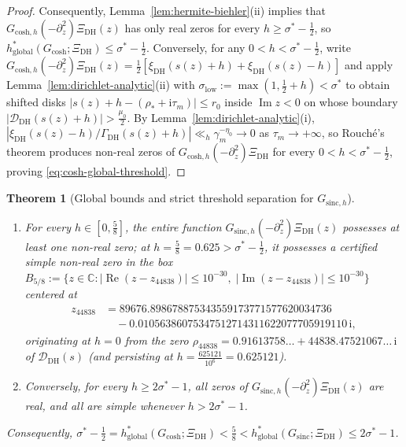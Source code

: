\documentclass[11pt,a4paper,reqno]{amsart}
\newtheorem{theorem}{Theorem}[section]
\theoremstyle{definition}
\theoremstyle{remark}
\numberwithin{equation}{section}
\newcommand{\C}{\mathbb{C}}
\newcommand{\ii}{\mathrm{i}}
\DeclareMathOperator{\Reop}{Re}
\DeclareMathOperator{\Imop}{Im}
\begin{document}
\begin{proof}
Consequently, Lemma~\ref{lem:hermite-biehler}(ii) implies that $G_{\mathrm{cosh},h}(-\partial_z^2)\Xi_{\mathrm{DH}}(z)$ has only real zeros for every $h \ge \sigma^* - \frac{1}{2}$, so $h_{\mathrm{global}}^*(G_{\mathrm{cosh}}; \Xi_{\mathrm{DH}}) \le \sigma^* - \frac{1}{2}$. Conversely, for any $0 < h < \sigma^* - \frac{1}{2}$, write $G_{\mathrm{cosh},h}(-\partial_z^2)\Xi_{\mathrm{DH}}(z) = \frac{1}{2}[\xi_{\mathrm{DH}}(s(z) + h) + \xi_{\mathrm{DH}}(s(z) - h)]$ and apply Lemma~\ref{lem:dirichlet-analytic}(ii) with $\sigma_{\mathrm{low}} := \max(1, \frac{1}{2} + h) < \sigma^*$ to obtain shifted disks $|s(z) + h - (\rho_* + \ii\tau_m)| \le r_0$ inside $\Imop z < 0$ on whose boundary $|\mathcal{D}_{\mathrm{DH}}(s(z)+h)| > \frac{\mu_0}{2}$. By Lemma~\ref{lem:dirichlet-analytic}(i), $|\xi_{\mathrm{DH}}(s(z) - h)/\Gamma_{\mathrm{DH}}(s(z) + h)| \ll_h \gamma_m^{-\eta_0} \to 0$ as $\tau_m \to +\infty$, so Rouch\'e's theorem produces non-real zeros of $G_{\mathrm{cosh},h}(-\partial_z^2)\Xi_{\mathrm{DH}}$ for every $0 < h < \sigma^* - \frac{1}{2}$, proving \eqref{eq:cosh-global-threshold}.
\end{proof}

\begin{theorem}[Global bounds and strict threshold separation for $G_{\mathrm{sinc},h}$]
\label{thm:sinc-separation}
\leavevmode
\begin{enumerate}[label=\textup{(\roman*)},leftmargin=2.0em]
  \item For every $h \in [0, \frac{5}{8}]$, the entire function $G_{\mathrm{sinc},h}(-\partial_z^2)\Xi_{\mathrm{DH}}(z)$ possesses at least one non-real zero; at $h = \frac{5}{8} = 0.625 > \sigma^* - \frac{1}{2}$, it possesses a certified simple non-real zero in the box $B_{5/8} := \{z \in \C : |\Reop(z - z_{44838})| \le 10^{-30},\; |\Imop(z - z_{44838})| \le 10^{-30}\}$ centered at
  \begin{equation}
    \begin{aligned}
      z_{44838} &= 89676.898678875343559173771577620034736 \\
      &\quad - 0.01056386075347512714311622077705919110\,\ii,
    \end{aligned}
    \label{eq:z-sinc-center}
  \end{equation}
  originating at $h = 0$ from the zero $\rho_{44838} = 0.91613758\ldots + 44838.47521067\ldots\,\ii$ of $\mathcal{D}_{\mathrm{DH}}(s)$ (and persisting at $h = \frac{625121}{10^6} = 0.625121$).
  \item Conversely, for every $h \ge 2\sigma^* - 1$, all zeros of $G_{\mathrm{sinc},h}(-\partial_z^2)\Xi_{\mathrm{DH}}(z)$ are real, and all are simple whenever $h > 2\sigma^* - 1$.
\end{enumerate}
Consequently, $\sigma^* - \frac{1}{2} = h_{\mathrm{global}}^*(G_{\mathrm{cosh}}; \Xi_{\mathrm{DH}}) < \frac{5}{8} < h_{\mathrm{global}}^*(G_{\mathrm{sinc}}; \Xi_{\mathrm{DH}}) \le 2\sigma^* - 1$.
\end{theorem}
\end{document}
